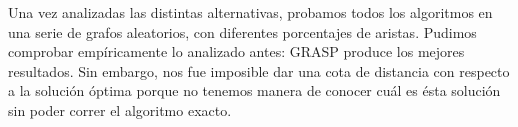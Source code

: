Una vez analizadas las distintas alternativas, probamos todos los algoritmos en una serie de grafos aleatorios, con diferentes porcentajes de aristas. Pudimos comprobar empíricamente lo analizado antes: GRASP produce los mejores resultados. Sin embargo, nos fue imposible dar una cota de distancia con respecto a la solución óptima porque no tenemos manera de conocer cuál es ésta solución sin poder correr el algoritmo exacto. \\
